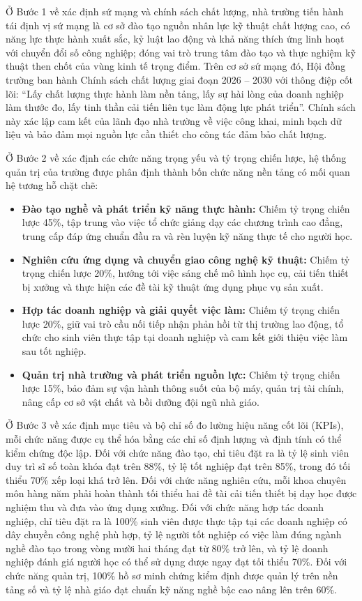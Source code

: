Ở Bước 1 về xác định sứ mạng và chính sách chất lượng, nhà trường tiến hành tái định vị sứ mạng là cơ sở đào tạo nguồn nhân lực kỹ thuật chất lượng cao, có năng lực thực hành xuất sắc, kỷ luật lao động và khả năng thích ứng linh hoạt với chuyển đổi số công nghiệp; đóng vai trò trung tâm đào tạo và thực nghiệm kỹ thuật then chốt của vùng kinh tế trọng điểm. Trên cơ sở sứ mạng đó, Hội đồng trường ban hành Chính sách chất lượng giai đoạn 2026 -- 2030 với thông điệp cốt lõi: ``Lấy chất lượng thực hành làm nền tảng, lấy sự hài lòng của doanh nghiệp làm thước đo, lấy tinh thần cải tiến liên tục làm động lực phát triển''. Chính sách này xác lập cam kết của lãnh đạo nhà trường về việc công khai, minh bạch dữ liệu và bảo đảm mọi nguồn lực cần thiết cho công tác đảm bảo chất lượng.

Ở Bước 2 về xác định các chức năng trọng yếu và tỷ trọng chiến lược, hệ thống quản trị của trường được phân định thành bốn chức năng nền tảng có mối quan hệ tương hỗ chặt chẽ:
\begin{itemize}
    \item \textbf{Đào tạo nghề và phát triển kỹ năng thực hành:} Chiếm tỷ trọng chiến lược 45\%, tập trung vào việc tổ chức giảng dạy các chương trình cao đẳng, trung cấp đáp ứng chuẩn đầu ra và rèn luyện kỹ năng thực tế cho người học.
    \item \textbf{Nghiên cứu ứng dụng và chuyển giao công nghệ kỹ thuật:} Chiếm tỷ trọng chiến lược 20\%, hướng tới việc sáng chế mô hình học cụ, cải tiến thiết bị xưởng và thực hiện các đề tài kỹ thuật ứng dụng phục vụ sản xuất.
    \item \textbf{Hợp tác doanh nghiệp và giải quyết việc làm:} Chiếm tỷ trọng chiến lược 20\%, giữ vai trò cầu nối tiếp nhận phản hồi từ thị trường lao động, tổ chức cho sinh viên thực tập tại doanh nghiệp và cam kết giới thiệu việc làm sau tốt nghiệp.
    \item \textbf{Quản trị nhà trường và phát triển nguồn lực:} Chiếm tỷ trọng chiến lược 15\%, bảo đảm sự vận hành thông suốt của bộ máy, quản trị tài chính, nâng cấp cơ sở vật chất và bồi dưỡng đội ngũ nhà giáo.
\end{itemize}

Ở Bước 3 về xác định mục tiêu và bộ chỉ số đo lường hiệu năng cốt lõi (KPIs), mỗi chức năng được cụ thể hóa bằng các chỉ số định lượng và định tính có thể kiểm chứng độc lập. Đối với chức năng đào tạo, chỉ tiêu đặt ra là tỷ lệ sinh viên duy trì sĩ số toàn khóa đạt trên 88\%, tỷ lệ tốt nghiệp đạt trên 85\%, trong đó tối thiểu 70\% xếp loại khá trở lên. Đối với chức năng nghiên cứu, mỗi khoa chuyên môn hàng năm phải hoàn thành tối thiểu hai đề tài cải tiến thiết bị dạy học được nghiệm thu và đưa vào ứng dụng xưởng. Đối với chức năng hợp tác doanh nghiệp, chỉ tiêu đặt ra là 100\% sinh viên được thực tập tại các doanh nghiệp có dây chuyền công nghệ phù hợp, tỷ lệ người tốt nghiệp có việc làm đúng ngành nghề đào tạo trong vòng mười hai tháng đạt từ 80\% trở lên, và tỷ lệ doanh nghiệp đánh giá người học có thể sử dụng được ngay đạt tối thiểu 70\%. Đối với chức năng quản trị, 100\% hồ sơ minh chứng kiểm định được quản lý trên nền tảng số và tỷ lệ nhà giáo đạt chuẩn kỹ năng nghề bậc cao nâng lên trên 60\%.

